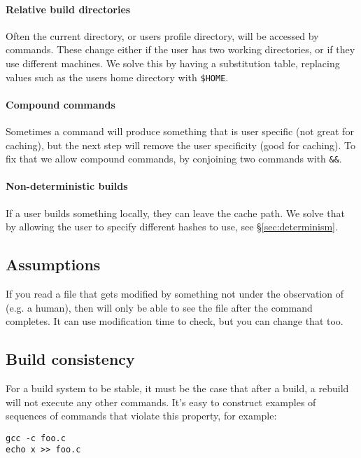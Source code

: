 \paragraph{Relative build directories} Often the current directory, or users profile directory, will be accessed by commands. These change either if the user has two working directories, or if they use different machines. We solve this by having a substitution table, replacing values such as the users home directory with \texttt{\$HOME}.

\paragraph{Compound commands} Sometimes a command will produce something that is user specific (not great for caching), but the next step will remove the user specificity (good for caching). To fix that we allow compound commands, by conjoining two commands with \texttt{\&\&}.

\paragraph{Non-deterministic builds} If a user builds something locally, they can leave the cache path. We solve that by allowing the user to specify different hashes to use, see \S\ref{sec:determinism}.

\subsection{Assumptions}

If you read a file that gets modified by something not under the observation of \Rattle (e.g. a human), then \Rattle will only be able to see the file after the command completes. It can use modification time to check, but you can change that too.

\subsection{Build consistency}

For a \Make build system to be stable, it must be the case that after a build, a rebuild will not execute any other commands. It's easy to construct examples of sequences of commands that violate this property, for example:

\begin{verbatim}
gcc -c foo.c
echo x >> foo.c
\end{verbatim}

